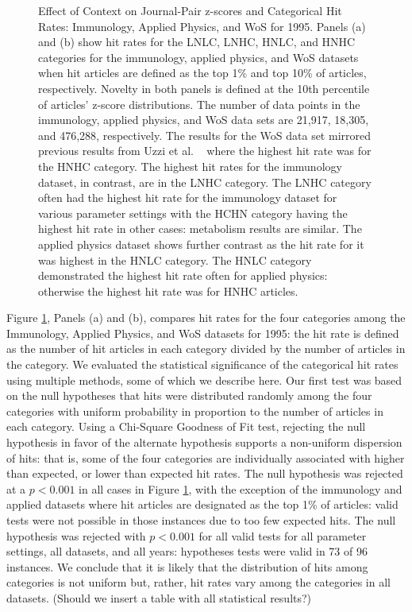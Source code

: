 \documentclass[NETN]{stjour}
\begin{document}
\begin{figure}
\caption{Effect of Context on Journal-Pair z-scores and Categorical Hit Rates: Immunology, Applied Physics, and WoS for 1995. Panels (a) and (b) show hit rates for the LNLC, LNHC, HNLC, and HNHC categories for the immunology, applied physics, and WoS datasets when hit articles are defined as the top 1\% and top 10\% of articles, respectively.  Novelty in both panels is defined at the 10th percentile of articles' z-score distributions. The number of data points in the immunology, applied physics, and WoS data sets are 21,917, 18,305, and 476,288, respectively.  The results for the WoS data set mirrored previous results from Uzzi et al. ~\cite{uzzi_atypical_2013} where the highest hit rate was for the HNHC category.  The highest hit rates for the immunology dataset, in contrast, are in the LNHC category. The LNHC category often had the highest hit rate for the immunology dataset for various parameter settings with the HCHN category having the highest hit rate in other cases: metabolism results are similar. The applied physics dataset shows further contrast as the hit rate for it was highest in the HNLC category.  The HNLC category demonstrated the highest hit rate often for applied physics: otherwise the highest hit rate was for HNHC articles.}
\label{fig:Fig2}
\end{figure}


Figure \ref{fig:Fig2}, Panels (a) and (b), compares hit rates for the four categories among the Immunology, Applied Physics, and WoS datasets for 1995: the hit rate is defined as the number of hit articles in each category divided by the number of articles in the category. We evaluated the statistical significance of the categorical hit rates using multiple methods, some of which we describe here.  Our first test was based on the null hypotheses that hits were distributed randomly among the four categories with uniform probability in proportion to the number of articles in each category. Using a Chi-Square Goodness of Fit test, rejecting the null hypothesis in favor of the alternate hypothesis supports a non-uniform dispersion of hits: that is, some of the four categories are individually associated with higher than expected, or lower than expected hit rates. The null hypothesis was rejected at a $p<0.001$ in all cases in  Figure \ref{fig:Fig2}, with the exception of the immunology and applied datasets where hit articles are designated as the top 1\% of articles: valid tests were not possible in those instances due to too few expected hits. The null hypothesis was rejected with $p<0.001$ for all valid tests for all parameter settings, all datasets, and all years: hypotheses tests were valid in 73 of 96 instances. We conclude that it is likely that the distribution of hits among categories is not uniform but, rather, hit rates vary among the categories in all datasets. (Should we insert a table with all statistical results?)
\end{document}
